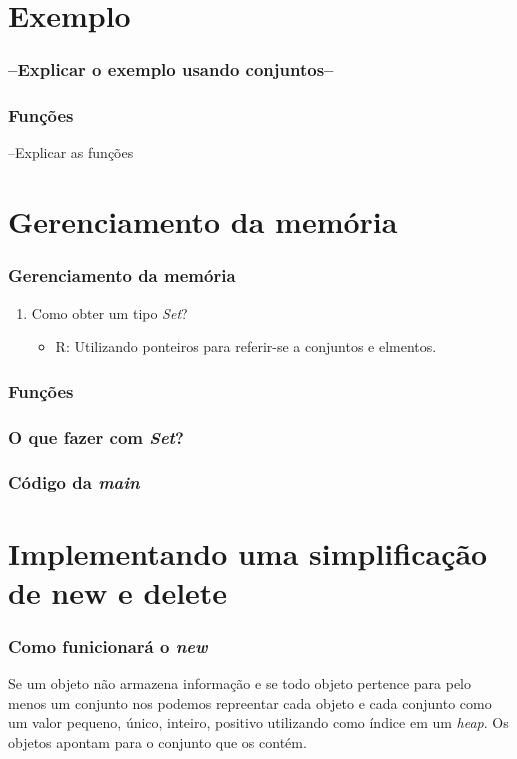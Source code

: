 \documentclass{beamer}
\begin{document}
\section{Exemplo}
\begin{frame}
  \frametitle{--Explicar o exemplo usando conjuntos--}
\end{frame}

\begin{frame}
  \frametitle{Funções}
  --Explicar as funções
\end{frame}

\section{Gerenciamento da memória}
\begin{frame}
 \frametitle{Gerenciamento da memória}
 \begin{enumerate}
  \item Como obter um tipo \textit{Set}?
  \begin{itemize}
   \item R: Utilizando ponteiros para referir-se a conjuntos e elmentos.
  \end{itemize}
 \end{enumerate}

\end{frame}

\begin{frame}
 \frametitle{Funções}
\end{frame}

\begin{frame}
 \frametitle{O que fazer com \textit{Set}?}
\end{frame}

\begin{frame}
 \frametitle{Código da \textit{main}}
\end{frame}

\section{Implementando uma simplificação de new e delete}
\begin{frame}
 \frametitle{Como funicionará o \textit{new}}
  Se um objeto não armazena informação e se todo objeto pertence para pelo menos 
  um conjunto nos podemos repreentar cada objeto e cada conjunto como um valor 
  pequeno, único, inteiro, positivo utilizando como índice em um \textit{heap}. 
  Os objetos apontam para o conjunto que os contém.
\end{frame}
\end{document}
